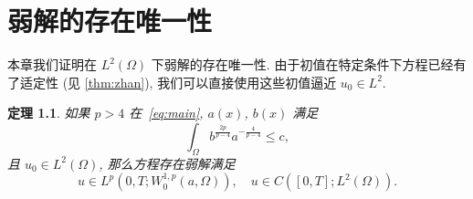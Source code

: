 \documentclass[twoside,longtitle]{LZUthesis}
\newtheorem{theorem}{定理}[chapter]
\theoremstyle{definition}
\numberwithin{equation}{chapter}
\begin{document}
\chapter{弱解的存在唯一性}\label{ch:Existence_and_uniqueness_of_the_weak_solution}
本章我们证明在 $L^2(\Omega)$ 下弱解的存在唯一性.
由于初值在特定条件下方程已经有了适定性 (见 \cref{thm:zhan}),
我们可以直接使用这些初值逼近 $u_0 \in L^2$.
\begin{theorem}\label{thm:absorb}
如果 $p>4$ 在~\cref{eq:main}, $a(x)$, $b(x)$ 满足
\begin{equation}
	\int_{\Omega} b^{\frac{2p}{p-4}}a^{-\frac{4}{p-4}} \leq c,
\end{equation}
且 $u_0 \in L^2(\Omega) $, 那么方程存在弱解满足
\begin{equation}
u \in L^p(0, T; W_0^{1,p}(a,\Omega)), \quad u \in C([0, T]; L^2(\Omega)).
\end{equation}
\end{theorem}
\end{document}
